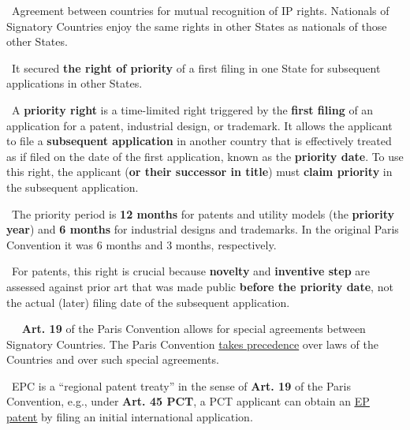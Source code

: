 \documentclass{report}
\newcommand{\n}{\newline}
\newcommand{\p}{\adforn{61} \ }
\newcommand{\s}{\adforn{74} \ }
\begin{document}
\p Agreement between countries for mutual recognition of IP rights. Nationals of Signatory Countries enjoy the same rights in other States as nationals of those other States. \n

\p It secured \textbf{the right of priority} of a first filing in one State for subsequent applications in other States. \n

\p A \textbf{priority right} is a time-limited right triggered by the \textbf{first filing} of an application for a patent, industrial design, or trademark. It allows the applicant to file a \textbf{subsequent application} in another country that is effectively treated as if filed on the date of the first application, known as the \textbf{priority date}. To use this right, the applicant (\textbf{or their successor in title}) must \textbf{claim priority} in the subsequent application. \n

\p The priority period is \textbf{12 months} for patents and utility models (the \textbf{priority year}) and \textbf{6 months} for industrial designs and trademarks. In the original Paris Convention it was 6 months and 3 months, respectively. \n

\p For patents, this right is crucial because \textbf{novelty} and \textbf{inventive step} are assessed against prior art that was made public \textbf{before the priority date}, not the actual (later) filing date of the subsequent application. \n

\vspace{5mm}

\p \textbf{\s Art. 19} of the Paris Convention allows for special agreements between Signatory Countries. The Paris Convention \underline{takes precedence} over laws of the Countries and over such special agreements. \n

\p EPC is a ``regional patent treaty'' in the sense of \textbf{Art. 19} of the Paris Convention, e.g., under \textbf{Art. 45 PCT}, a PCT applicant can obtain an \underline{\underline{EP patent}} by filing an initial international application. \n

\vspace{5mm}
\end{document}
